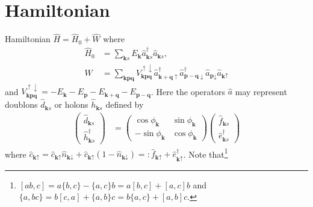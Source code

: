 \documentclass[english, parskip=full]{scrartcl}
\title{\titel}
\author{\autor}
\date{\today}
\newcommand{\klam}{}
\newcommand{\klammer}{}
\begin{document}
\maketitle  %

\section{Hamiltonian}
Hamiltonian $\hat{H} = \hat{H}_0 + \hat{W}$ where
\begin{align}
\hat{H}_0 &= \sum_{\textbf{k}s} E_\textbf{k} \hat{a}_{\textbf{k}s}^\dagger  \hat{a}_{\textbf{k}s},\\
\hat{W} &= \sum_{\textbf{kpq}} V_\textbf{kpq}^{\uparrow\downarrow}  \hat{a}_{\textbf{k} + \textbf{q} \uparrow}^\dagger \hat{a}_{\textbf{p} - \textbf{q} \downarrow}^\dagger \hat{a}_{\textbf{p} \downarrow} \hat{a}_{\textbf{k} \uparrow}
\end{align}
and $V_\textbf{kpq}^{\uparrow\downarrow} = -E_\textbf{k} - E_\textbf{p} - E_\mathbf{k+q} - E_\mathbf{p-q}$.
Here the operators $\hat{a}$ may represent doublons $\hat{d}_{\textbf{k}s}$ or holons $\hat{h}_{\textbf{k}s}$ defined by
\begin{align}
\begin{pmatrix}
\hat{d}_{\textbf{k}s} \\ \hat{h}_{\textbf{k}s}^\dagger
\end{pmatrix} &= \begin{pmatrix}
\cos\phi_\textbf{k} & \sin\phi_\textbf{k} \\ -\sin\phi_\textbf{k} & \cos\phi_\textbf{k}
\end{pmatrix} \begin{pmatrix}
\hat{f}_{\textbf{k}s} \\ \hat{e}_{\textbf{k}s}^\dagger
\end{pmatrix}
\end{align}
where $\hat{c}_{\textbf{k}\uparrow} = \hat{c}_{\textbf{k}\uparrow} \hat{n}_{\textbf{k}\downarrow} + \hat{c}_{\textbf{k}\uparrow} (1 - \hat{n}_{\textbf{k}\downarrow}) =: \hat{f}_{\textbf{k}\uparrow} + \hat{e}_{\textbf{k}\uparrow}^\dagger$.
Note that\footnote{$[ab,c] = a\{b,c\} - \{a,c\}b = a[b,c] + [a,c]b$ and $\{a,bc\} = b[c,a] + \{a,b\} c = b\{a,c\} + [a,b]c$.}
\end{document}
